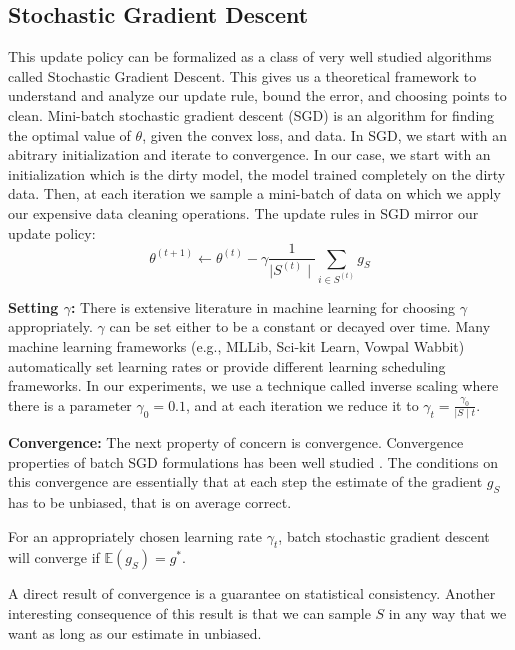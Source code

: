 \subsection{Stochastic Gradient Descent}
This update policy can be formalized as a class of very well studied algorithms called Stochastic Gradient Descent.
This gives us a theoretical framework to understand and analyze our update rule, bound the error, and choosing points to clean.
Mini-batch stochastic gradient descent (SGD) is an algorithm for finding the optimal value
of $\theta$, given the convex loss, and data.
In SGD, we start with an abitrary initialization and iterate to convergence.
In our case, we start with an initialization which is the dirty model, the model trained completely on the dirty data.
Then, at each iteration we sample a mini-batch of data on which we apply our expensive data cleaning operations.
The update rules in SGD mirror our update policy:
 \[
 \theta^{(t+1)}\leftarrow\theta^{(t)}-\gamma\frac{1}{\mid S^{(t)}\mid}\sum_{i\in S^{(t)}}g_S
 \]

\vspace{0.5em}

\noindent\textbf{ Setting $\gamma$: } There is extensive literature in machine learning for choosing $\gamma$ appropriately. $\gamma$ can be set either to be a constant or decayed over time. Many machine learning frameworks (e.g., MLLib, Sci-kit Learn, Vowpal Wabbit) automatically set learning rates or provide different learning scheduling frameworks. 
In our experiments, we use a technique called inverse scaling where there is a parameter $\gamma_0=0.1$, and at each iteration we reduce it to $\gamma_t = \frac{\gamma_0}{\mid S \mid t}$. 

\vspace{0.5em}

\noindent\textbf{ Convergence: } The next property of concern is convergence. Convergence properties of batch SGD formulations has been well studied \cite{dekel2012optimal}. 
The conditions on this convergence are essentially that at each step the estimate of the gradient $g_S$ has to be unbiased, that is on average correct. 

\begin{proposition}
For an appropriately chosen learning rate $\gamma_t$, batch stochastic gradient descent will converge if $\mathbb{E}(g_S)=g^*$.
\label{unbiased}
\end{proposition}

A direct result of convergence is a guarantee on statistical consistency.
Another interesting consequence of this result is that we can sample $S$ in any way that we want
as long as our estimate in unbiased.

